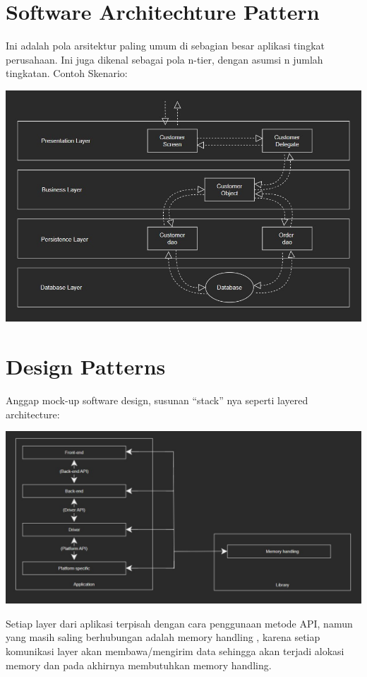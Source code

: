 \section{Software Architechture Pattern}
Ini adalah pola arsitektur paling umum di sebagian besar aplikasi tingkat perusahaan. Ini juga dikenal sebagai pola n-tier, dengan asumsi n jumlah tingkatan. Contoh Skenario:

\includegraphics[width=\textwidth]{../images/chapter05/Software Architecture Pattern}


\section{Design Patterns}

Anggap mock-up software design, susunan “stack” nya seperti layered architecture:

\includegraphics[width=\textwidth]{../images/chapter05/Design Pattern}

Setiap layer dari aplikasi terpisah dengan cara penggunaan metode API, namun yang masih saling berhubungan adalah memory handling , karena setiap komunikasi layer akan membawa/mengirim data sehingga akan terjadi alokasi memory dan pada akhirnya membutuhkan memory handling.

